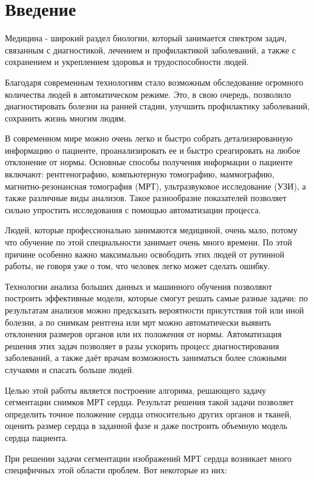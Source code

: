 \section{Введение}
Медицина - широкий раздел биологии, который занимается спектром задач, связанным с диагностикой, лечением и профилактикой заболеваний, а также с сохранением и укреплением здоровья и трудоспособности людей. 

Благодаря современным технологиям стало возможным обследование огромного количества людей в автоматическом режиме. Это, в свою очередь, позволило диагностировать болезни на ранней стадии, улучшить профилактику заболеваний, сохранить жизнь многим людям.

В современном мире можно очень легко и быстро собрать детализированную информацию о пациенте, проанализировать ее и быстро среагировать на любое отклонение от нормы. Основные способы получения информации о пациенте включают: рентгенографию, компьютерную томографию, маммографию, магнитно-резонансная томография (МРТ), ультразвуковое исследование (УЗИ), а также различные виды анализов. Такое разнообразие показателей позволяет сильно упростить исследования с помощью автоматизации процесса.

Людей, которые профессионально занимаются медициной, очень мало, потому что обучение по этой специальности занимает очень много времени. По этой причине особенно важно максимально освободить этих людей от рутинной работы, не говоря уже о том, что человек легко может сделать ошибку.

Технологии анализа больших данных и машинного обучения позволяют построить эффективные модели, которые смогут решать самые разные задачи: по результатам анализов можно предсказать вероятности присутствия той или иной болезни, а по снимкам рентгена или мрт можно автоматически выявить отклонения размеров органов или их положения от нормы. Автоматизация решения этих задач позволяет в разы ускорить процесс диагностирования заболеваний, а также даёт врачам возможность заниматься более сложными случаями и спасать больше людей.

Целью этой работы является построение алгорима, решающего задачу сегментации снимков МРТ сердца. Результат решения такой задачи позволяет определить точное положение сердца относительно других органов и тканей, оценить размер сердца в заданной фазе и даже построить объемную модель сердца пациента.

При решении задачи сегментации изображений МРТ сердца возникает много специфичных этой области проблем. Вот некоторые из них:

